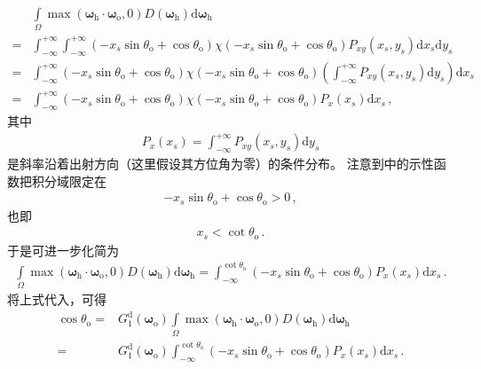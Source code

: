 \begin{align}\label{eq:08-ex01-trans-1d-slope}
      & \int\limits_{\varOmega}\max({\bm\omega}_{\mathrm{h}}\cdot{\bm\omega}_{\mathrm{o}},0)
    D({\bm\omega}_{\mathrm{h}})\mathrm{d}{\bm\omega}_{\mathrm{h}}\nonumber                   \\
    = & \int_{-\infty}^{+\infty}\int_{-\infty}^{+\infty}
    (-x_s\sin\theta_{\mathrm{o}}+\cos\theta_{\mathrm{o}})
    \chi(-x_s\sin\theta_{\mathrm{o}}+\cos\theta_{\mathrm{o}})
    P_{xy}(x_s,y_s)\mathrm{d}x_s\mathrm{d}y_s\nonumber                                       \\
    = & \displaystyle\int_{-\infty}^{+\infty}
    (-x_s\sin\theta_{\mathrm{o}}+\cos\theta_{\mathrm{o}})
    \chi(-x_s\sin\theta_{\mathrm{o}}+\cos\theta_{\mathrm{o}})
    \left(\int_{-\infty}^{+\infty}P_{xy}(x_s,y_s)\mathrm{d}y_s\right)\mathrm{d}x_s\nonumber  \\
    = & \displaystyle\int_{-\infty}^{+\infty}
    (-x_s\sin\theta_{\mathrm{o}}+\cos\theta_{\mathrm{o}})
    \chi(-x_s\sin\theta_{\mathrm{o}}+\cos\theta_{\mathrm{o}})P_x(x_s)\mathrm{d}x_s\, ,
\end{align}
其中
\begin{align}\label{eq:08-ex01-condition-1d-slope}
    P_x(x_s)=\int_{-\infty}^{+\infty}P_{xy}(x_s,y_s)\mathrm{d}y_s
\end{align}
是斜率沿着出射方向（这里假设其方位角为零）的条件分布。
注意到中的示性函数把积分域限定在
\begin{align}
    -x_s\sin\theta_{\mathrm{o}}+\cos\theta_{\mathrm{o}}>0\, ,
\end{align}
也即
\begin{align}
    x_s<\cot\theta_{\mathrm{o}}\, .
\end{align}
于是可进一步化简为
\begin{align}
    \int\limits_{\varOmega}\max({\bm\omega}_{\mathrm{h}}\cdot{\bm\omega}_{\mathrm{o}},0)
    D({\bm\omega}_{\mathrm{h}})\mathrm{d}{\bm\omega}_{\mathrm{h}}
    =\int_{-\infty}^{\cot\theta_{\mathrm{o}}}
    (-x_s\sin\theta_{\mathrm{o}}+\cos\theta_{\mathrm{o}})P_x(x_s)\mathrm{d}x_s\, .
\end{align}
将上式代入，可得
\begin{align}
    \cos\theta_{\mathrm{o}}
    = & G_1^{\mathrm{d}}({\bm\omega}_{\mathrm{o}})
    \int\limits_{\varOmega}\max({\bm\omega}_{\mathrm{h}}\cdot{\bm\omega}_{\mathrm{o}},0)
    D({\bm\omega}_{\mathrm{h}})\mathrm{d}{\bm\omega}_{\mathrm{h}}\nonumber \\
    = & G_1^{\mathrm{d}}({\bm\omega}_{\mathrm{o}})
    \int_{-\infty}^{\cot\theta_{\mathrm{o}}}
    (-x_s\sin\theta_{\mathrm{o}}+\cos\theta_{\mathrm{o}})P_x(x_s)\mathrm{d}x_s\, .
\end{align}
